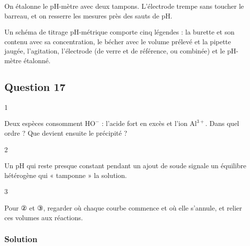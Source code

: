 \documentclass[11pt,a4paper]{article}
\begin{document}
On étalonne le pH-mètre avec deux tampons. L'électrode trempe sans toucher le barreau, et on resserre les mesures près des sauts de pH.

\begin{methode}

Un schéma de titrage pH-métrique comporte cinq légendes : la burette et son contenu avec sa concentration, le bécher avec le volume prélevé et la pipette jaugée, l'agitation, l'électrode (de verre et de référence, ou combinée) et le pH-mètre étalonné.

\end{methode}

\hypertarget{question-17}{%
\subsection{Question 17}\label{question-17}}

\begin{indication}{1}

Deux espèces consomment \(\mathrm{HO^-}\) : l'acide fort en excès et l'ion \(\mathrm{Al^{3+}}\). Dans quel ordre ? Que devient ensuite le précipité ?

\end{indication}

\begin{indication}{2}

Un pH qui reste presque constant pendant un ajout de soude signale un équilibre hétérogène qui « tamponne » la solution.

\end{indication}

\begin{indication}{3}

Pour ② et ③, regarder où chaque courbe commence et où elle s'annule, et relier ces volumes aux réactions.

\end{indication}

\hypertarget{solution-16}{%
\subsubsection{Solution}\label{solution-16}}
\end{document}
